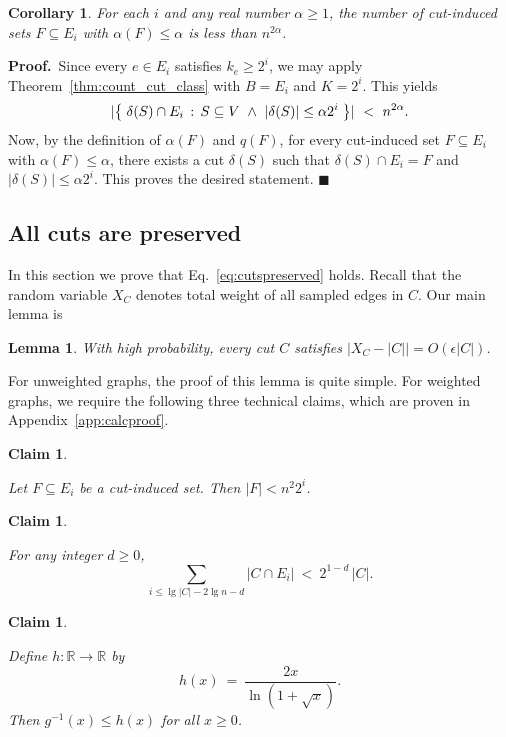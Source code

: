 \documentclass[11pt]{article}
\newcommand{\proofbelow}{8pt}
\numberwithin{equation}{section}
\newtheorem{lemma}[theorem]{Lemma}
\newtheorem{corollary}[theorem]{Corollary}
\newtheorem{claim}[theorem]{Claim}
\renewenvironment{proof}{\noindent\textbf{Proof.}\,}{\afterproof}
\newcommand{\afterproof}{\hfill $\blacksquare$ \par \vspace{\proofbelow}}
\newcommand{\bR}{\mathbb{R}}
\newcommand{\intersect}{\cap}
\newcommand{\abs}[1]{\lvert #1 \rvert}
\newcommand{\card}[1]{\abs{#1}}
\newcommand{\Appendix}[1]{Appendix~\ref{app:#1}}
\newcommand{\ClaimName}[1]{\label{clm:#1}}
\newcommand{\CorollaryName}[1]{\label{cor:#1}}
\newcommand{\Equation}[1]{Eq.~\eqref{eq:#1}}
\newcommand{\LemmaName}[1]{\label{lem:#1}}
\newcommand{\SectionName}[1]{\label{sec:#1}}
\newcommand{\Theorem}[1]{Theorem~\ref{thm:#1}}
\begin{document}
\begin{corollary}
\CorollaryName{count_canonical_cut}
For each $i$ and any real number $\alpha\ge 1$, 
the number of cut-induced sets $F \subseteq E_i$ with $\alpha(F) \leq \alpha$
is less than $n^{2\alpha}$.
\end{corollary}
\begin{proof}
Since every $e \in E_i$ satisfies $k_e \geq 2^i$,
we may apply \Theorem{count_cut_class} with $B=E_i$ and $K=2^i$.
This yields 
$$
\card{ \setst{ \delta(S) \intersect E_i }{ S \subseteq V ~\wedge~ \card{\delta(S)} \leq \alpha 2^i } }
    ~<~ n^{2\alpha}.
$$
Now, by the definition of $\alpha(F)$ and $q(F)$,
for every cut-induced set $F \subseteq E_i$ with $\alpha(F) \leq \alpha$,
there exists a cut $\delta(S)$ such that $\delta(S) \intersect E_i = F$
and $\card{\delta(S)} \leq \alpha 2^i$.
This proves the desired statement.
\end{proof}

\subsection{All cuts are preserved}
\SectionName{allcuts}

In this section we prove that \Equation{cutspreserved} holds.
Recall that the random variable $X_C$ denotes total weight of all sampled edges in $C$.
Our main lemma is

\begin{lemma}
\LemmaName{wtderror}
With high probability, every cut $C$ satisfies $|X_C - |C|| = O(\epsilon |C|)$.
\end{lemma}



For unweighted graphs, the proof of this lemma is quite simple.
For weighted graphs, we require the following three technical claims,
which are proven in \Appendix{calcproof}.


\newcommand{\clmfsmall}{
    Let $F \subseteq E_i$ be a cut-induced set. Then $|F|< n^2 2^i$.
}
\begin{claim}
\ClaimName{Fsmall}
\clmfsmall
\end{claim}


\newcommand{\clmconc}{
    For any integer $d\ge 0$,
    $$
        \sum_{i\le \lg |C|-2 \lg n - d} \card{C \intersect E_i} ~<~ 2^{1-d} \, |C|.
    $$
}
\begin{claim}
\ClaimName{concentrate_in_large_Ci}
\clmconc
\end{claim}


\newcommand{\clmginv}{
    Define $h : \bR \rightarrow \bR$ by
    $$
    h(x) ~=~ \frac{2x}{\ln(1+\sqrt{x})}.
    $$
    Then $g^{-1}(x) \leq h(x)$ for all $x \geq 0$.
}
\begin{claim}
\ClaimName{ginv}
\clmginv
\end{claim}
\end{document}
